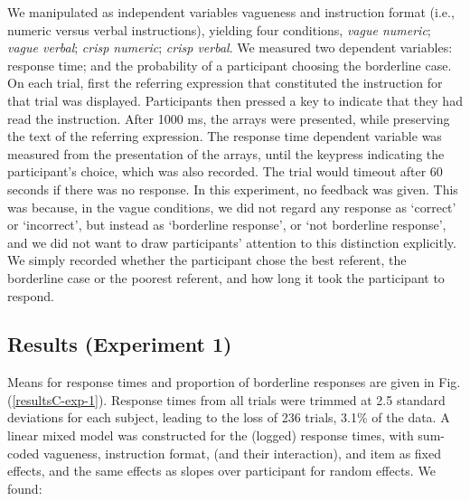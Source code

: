 We manipulated as independent variables vagueness and instruction format (i.e., numeric versus verbal instructions), yielding four conditions, \emph{vague numeric}; \emph{vague verbal}; \emph{crisp numeric}; \emph{crisp verbal}.
We measured two dependent variables: response time; and the probability of a participant choosing the borderline case. On each trial, first the referring expression that constituted the instruction for that trial was displayed. 
Participants then pressed a key to indicate that they had read the instruction. After 1000 ms, the arrays were presented, while preserving the text of the referring expression. The response time dependent variable was measured from the presentation of the arrays, until the keypress indicating the participant's choice, which was also recorded. The trial would timeout after 60 seconds if there was no response. In this experiment, no feedback was given. This was because, in the vague conditions, we did not regard any response as `correct' or `incorrect', but instead as `borderline response', or `not borderline response', and we did not want to draw participants' attention to this distinction explicitly. We simply recorded whether the participant chose the best referent, the borderline case or the poorest referent, and how long it took the participant to respond.

\subsection{Results (Experiment 1)} 

Means for response times and proportion of borderline responses are given in Fig. (\ref{resultsC-exp-1}). Response times from all trials were trimmed at 2.5 standard deviations for each subject, leading to the loss of 236 trials, 3.1\% of the data. A linear mixed model was constructed for the (logged) response times, with sum-coded vagueness, instruction format, (and their interaction), and item as fixed effects, and the same effects as slopes over participant for random effects. We found:

